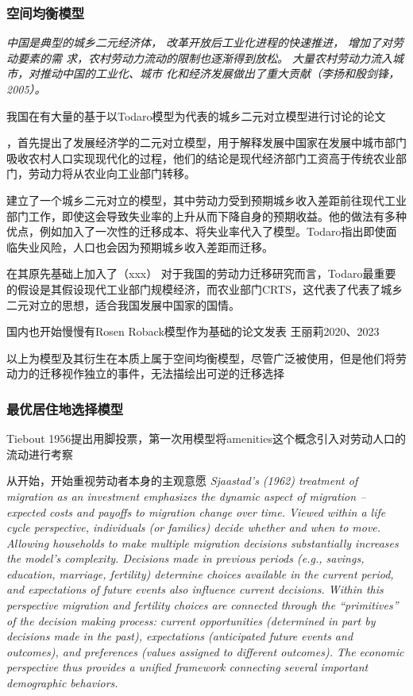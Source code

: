 \documentclass[10pt,a4paper]{article}
\begin{document}
\subsubsection{空间均衡模型}
\textit{中国是典型的城乡二元经济体， 改革开放后工业化进程的快速推进， 增加了对劳动要素的需 求，农村劳动力流动的限制也逐渐得到放松。 大量农村劳动力流入城市，对推动中国的工业化、城市 化和经济发展做出了重大贡献（李扬和殷剑锋，2005）。}

我国在有大量的基于以Todaro模型为代表的城乡二元对立模型进行讨论的论文

\cite{lewisEconomicDevelopmentUnlimited1954}，\cite{ranisTheoryEconomicDevelopment1961}首先提出了发展经济学的二元对立模型，用于解释发展中国家在发展中城市部门吸收农村人口实现现代化的过程，他们的结论是现代经济部门工资高于传统农业部门，劳动力将从农业向工业部门转移。

\cite{todaroModelLaborMigration1969}建立了一个城乡二元对立的模型，其中劳动力受到预期城乡收入差距前往现代工业部门工作，即使这会导致失业率的上升从而下降自身的预期收益。他的做法有多种优点，例如加入了一次性的迁移成本、将失业率代入了模型。Todaro指出即使面临失业风险，人口也会因为预期城乡收入差距而迁移。

\cite{harrisMigrationUnemploymentDevelopment1970}在其原先基础上加入了（xxx）
对于我国的劳动力迁移研究而言，Todaro最重要的假设是其假设现代工业部门规模经济，而农业部门CRTS，这代表了代表了城乡二元对立的思想，适合我国发展中国家的国情。


\cite{rosenWageBasedIndexesUrban1979,robackWagesRentsQuality1982,robackWagesRentsAmenities1988}
国内也开始慢慢有Rosen Roback模型作为基础的论文发表
王丽莉2020、2023

以上为模型及其衍生在本质上属于空间均衡模型，尽管广泛被使用，但是他们将劳动力的迁移视作独立的事件，无法描绘出可逆的迁移选择

\subsubsection{最优居住地选择模型}
Tiebout 1956提出用脚投票，第一次用模型将amenities这个概念引入对劳动人口的流动进行考察

从\cite{sjaastadCostsReturnsHuman1962}开始，开始重视劳动者本身的主观意愿
\textit{Sjaastad’s (1962) treatment of migration as an investment emphasizes the dynamic  aspect of migration – expected costs and payoffs to migration change over time. Viewed  within a life cycle perspective, individuals (or families) decide whether and when to  move. Allowing households to make multiple migration decisions substantially increases the model’s complexity. Decisions made in previous periods (e.g., savings, education,  marriage, fertility) determine choices available in the current period, and expectations  of future events also influence current decisions. Within this perspective migration and  fertility choices are connected through the “primitives” of the decision making process:  current opportunities (determined in part by decisions made in the past), expectations  (anticipated future events and outcomes), and preferences (values assigned to different  outcomes). The economic perspective thus provides a unified framework connecting several important demographic behaviors.}
\end{document}
